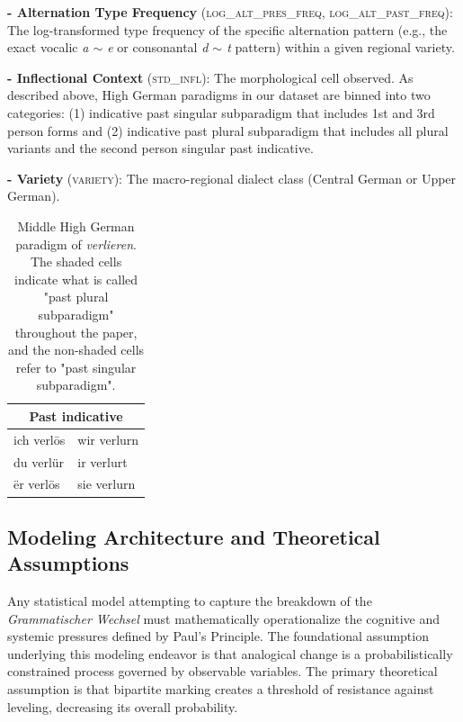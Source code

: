 \textbf{- Alternation Type Frequency} (\textsc{log\_alt\_pres\_freq}, \textsc{log\_alt\_past\_freq}): The log-transformed type frequency of the specific alternation pattern (e.g., the exact vocalic \textit{a $\sim$ e} or consonantal \textit{d $\sim$ t} pattern) within a given regional variety.

\textbf{- Inflectional Context} (\textsc{std\_infl}): The morphological cell observed. As described above, High German paradigms in our dataset are binned into two categories: (1) indicative past singular subparadigm that includes 1st and 3rd person forms and (2) indicative past plural subparadigm that includes all plural variants and the second person singular past indicative.

\textbf{- Variety} (\textsc{variety}): The macro-regional dialect class (Central German or Upper German).

\begin{table}[ht]
\centering
\renewcommand{\arraystretch}{1.4} %
\setlength{\tabcolsep}{24pt}      %
\begin{tabular}{|l|l|}
\hline
\multicolumn{2}{|c|}{\textbf{Past indicative}} \\ \hline
ich verl\={o}s & \cellcolor{tablegrey}wir verlurn \\ \hline
\cellcolor{tablegrey}du verl\"{u}r & \cellcolor{tablegrey}ir verlurt \\ \hline
\"{e}r verl\={o}s & \cellcolor{tablegrey}sie verlurn \\ \hline
\end{tabular}
\caption{Middle High German paradigm of \textit{verlieren}. The shaded cells indicate what is called "past plural subparadigm" throughout the paper, and the non-shaded cells refer to "past singular subparadigm".}
\end{table}

\subsection{Modeling Architecture and Theoretical Assumptions}

Any statistical model attempting to capture the breakdown of the \textit{Grammatischer Wechsel} must mathematically operationalize the cognitive and systemic pressures defined by Paul's Principle. The foundational assumption underlying this modeling endeavor is that analogical change is a probabilistically constrained process governed by observable variables. The primary theoretical assumption is that bipartite marking creates a threshold of resistance against leveling, decreasing its overall probability.

